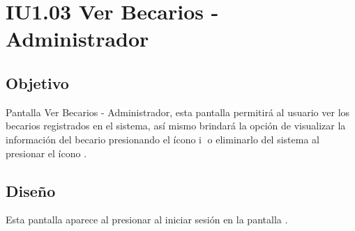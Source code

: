 \newpage
\section{IU1.03 Ver Becarios - Administrador}

\subsection{Objetivo}
	Pantalla Ver Becarios - Administrador, esta pantalla permitirá al usuario  ver los becarios registrados en el sistema, así mismo brindará la opción de visualizar la información del becario presionando el ícono \textcircled{i} o eliminarlo del sistema al presionar el ícono \faTrashO.
	


\subsection{Diseño}
    Esta pantalla aparece al presionar al iniciar sesión en la pantalla .

	
